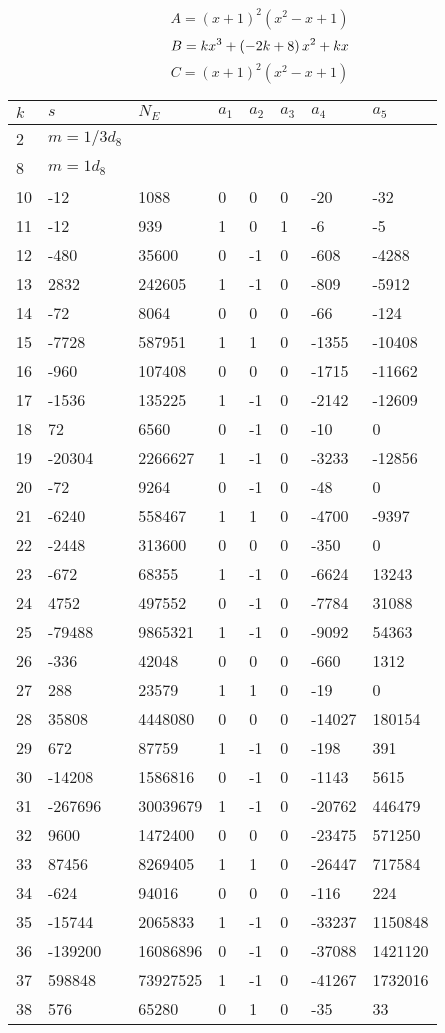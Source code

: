 \documentclass{amsart}
\begin{document}
$$A=(x
 + 1)^{2}(x^2
 - x
 + 1)$$
$$B=k\*x^3
 + \left(-2\*k
 + 8\right) \*x^2
 + k\*x$$
$$C=(x
 + 1)^{2}(x^2
 - x
 + 1)$$
\begin{longtable}{|l|l|l|lllll|}
\hline
$k$ & $s$ & $N_E$ & $a_1$ & $a_2$ & $a_3$ & $a_4$ & $a_5$\\
\hline
2&$m=1/3d_{8}$&&\multicolumn{5}{c|}{}\\
8&$m=1d_{8}$&&\multicolumn{5}{c|}{}\\
10&-12&1088&0&0&0&-20&-32\\
11&-12&939&1&0&1&-6&-5\\
12&-480&35600&0&-1&0&-608&-4288\\
13&2832&242605&1&-1&0&-809&-5912\\
14&-72&8064&0&0&0&-66&-124\\
15&-7728&587951&1&1&0&-1355&-10408\\
16&-960&107408&0&0&0&-1715&-11662\\
17&-1536&135225&1&-1&0&-2142&-12609\\
18&72&6560&0&-1&0&-10&0\\
19&-20304&2266627&1&-1&0&-3233&-12856\\
20&-72&9264&0&-1&0&-48&0\\
21&-6240&558467&1&1&0&-4700&-9397\\
22&-2448&313600&0&0&0&-350&0\\
23&-672&68355&1&-1&0&-6624&13243\\
24&4752&497552&0&-1&0&-7784&31088\\
25&-79488&9865321&1&-1&0&-9092&54363\\
26&-336&42048&0&0&0&-660&1312\\
27&288&23579&1&1&0&-19&0\\
28&35808&4448080&0&0&0&-14027&180154\\
29&672&87759&1&-1&0&-198&391\\
30&-14208&1586816&0&-1&0&-1143&5615\\
31&-267696&30039679&1&-1&0&-20762&446479\\
32&9600&1472400&0&0&0&-23475&571250\\
33&87456&8269405&1&1&0&-26447&717584\\
34&-624&94016&0&0&0&-116&224\\
35&-15744&2065833&1&-1&0&-33237&1150848\\
36&-139200&16086896&0&-1&0&-37088&1421120\\
37&598848&73927525&1&-1&0&-41267&1732016\\
38&576&65280&0&1&0&-35&33\\

\end{longtable}
\end{document}
